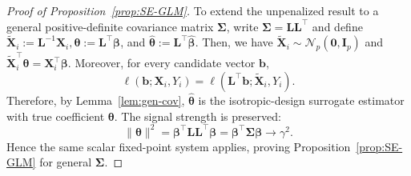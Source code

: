 \documentclass[12pt,reqno]{amsart}
\renewcommand{\hat}{\widehat}
\begin{document}
{\begin{proof}[Proof of Proposition~\ref{prop:SE-GLM}]
To extend the unpenalized result to a general positive-definite covariance
matrix $\bm\Sigma$, write
$
\bm\Sigma=\bm L\bm L^\top
$
and define
$
\widetilde{\bm X}_i:=\bm L^{-1}\bm X_i,
\bm\theta:=\bm L^\top\bm\beta$, and 
$
\hat{\bm\theta}:=\bm L^\top\hat{\bm\beta}.
$
Then, we have
$
\widetilde{\bm X}_i\sim\mathcal N_p(\bm0,\bm I_p)
$
and
$
\widetilde{\bm X}_i^\top\bm\theta
=
\bm X_i^\top\bm\beta.
$
Moreover, for every candidate vector $\bm b$,
\[
\ell(\bm b;\bm X_i,Y_i)
=
\ell(\bm L^\top\bm b;\widetilde{\bm X}_i,Y_i).
\]
Therefore, by Lemma~\ref{lem:gen-cov},
$\hat{\bm\theta}$ is the isotropic-design surrogate estimator with true
coefficient $\bm\theta$. The signal strength is preserved:
\[
\|\bm\theta\|^2
=
\bm\beta^\top\bm L\bm L^\top\bm\beta
=
\bm\beta^\top\bm\Sigma\bm\beta
\to
\gamma^2.
\]
Hence the same scalar fixed-point system applies, proving
Proposition~\ref{prop:SE-GLM} for general $\bm\Sigma$.
\end{proof}
}
\end{document}
